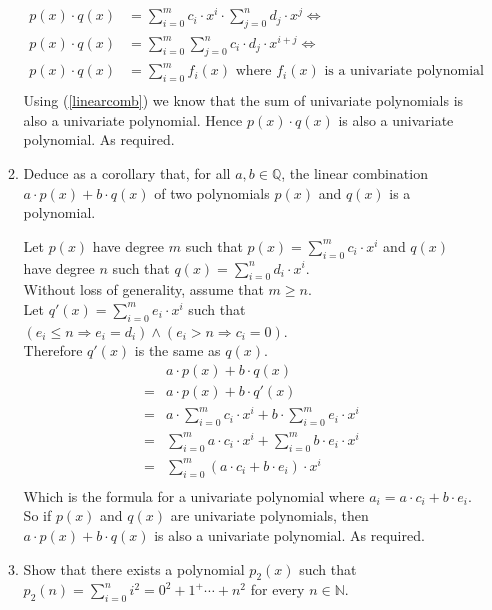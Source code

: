 \documentclass[10pt,\jkfside,a4paper]{article}
\begin{document}
\begin{enumerate}
\begin{enumerate}
\begin{equation}
\begin{split}
p(x)\cdot q(x) &= \sum^{m}_{i=0}c_i \cdot x^i \cdot \sum^{n}_{j=0}d_j \cdot x^j \Longleftrightarrow\\
p(x)\cdot q(x) &= \sum^{m}_{i=0}\sum^{n}_{j=0}c_i \cdot d_j \cdot x^{i + j} \Longleftrightarrow\\
p(x)\cdot q(x) &= \sum^m_{i = 0} f_i(x)\text{ where }f_i(x)\text{ is a univariate polynomial}\\
\end{split}
\end{equation}
Using (\ref{linearcomb}) we know that the sum of univariate polynomials is also a univariate polynomial. 
Hence $p(x)\cdot q(x)$ is also a univariate polynomial. As required.

\item Deduce as a corollary that, for all $a, b \in \mathbb{Q}$, the linear combination $a \cdot p(x) + b \cdot q(x)$ 
of two polynomials $p(x)$ and $q(x)$ is a polynomial.

Let $p(x)$ have degree $m$ such that $p(x) = \sum^{m}_{i=0}c_i \cdot x^i$ and $q(x)$ have degree $n$ such that $q(x) = \sum^{n}_{i=0}d_i \cdot x^i$.\\
Without loss of generality, assume that $m \geq n$.\\
Let $q'(x) = \sum^{m}_{i=0}e_i\cdot x^i$ such that $(e_i \leq n \Longrightarrow e_i = d_i) \wedge (e_i > n \Longrightarrow c_i = 0)$.\\
Therefore $q'(x)$ is the same as $q(x)$.
\begin{equation}
\begin{split}
 & a \cdot p(x) + b \cdot q(x)\\
=& a \cdot p(x) + b \cdot q'(x)\\
=& a \cdot \sum^{m}_{i=0}c_i\cdot x^i + b \cdot \sum^{m}_{i=0}e_i\cdot x^i\\
=& \sum^{m}_{i=0}a \cdot c_i\cdot x^i + \sum^{m}_{i=0}b \cdot e_i\cdot x^i\\
=& \sum^{m}_{i=0}(a \cdot c_i + b \cdot e_i)\cdot x^i\\
\end{split}
\end{equation}
Which is the formula for a univariate polynomial where $a_i = a\cdot c_i + b\cdot e_i$. So if $p(x)$ and $q(x)$ are univariate polynomials, then 
$a \cdot p(x) + b \cdot q(x)$ is also a univariate polynomial. As required.


\item Show that there exists a polynomial $p_2(x)$ such that $p_2(n) = \sum^n_{i=0}i^2 = 0^2 + 1^ + \cdots + n^2$ 
for every $n \in \mathbb{N}$.


\end{enumerate}
\end{enumerate}
\end{document}
